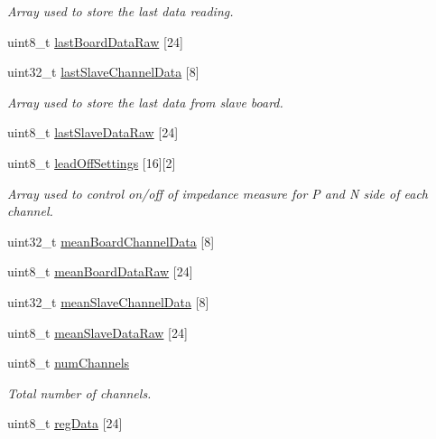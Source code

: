\begin{DoxyCompactItemize}
\begin{DoxyCompactList}\small\item\em Array used to store the last data reading. \end{DoxyCompactList}\item 
uint8\+\_\+t \hyperlink{group__ADS1299__Library_ga7a5c129fa297decd31d1b5b2860b3b6f}{last\+Board\+Data\+Raw} \mbox{[}24\mbox{]}
\item 
uint32\+\_\+t \hyperlink{group__ADS1299__Library_gaf412b1daf072ddca4def438f97d2c65c}{last\+Slave\+Channel\+Data} \mbox{[}8\mbox{]}
\begin{DoxyCompactList}\small\item\em Array used to store the last data from slave board. \end{DoxyCompactList}\item 
uint8\+\_\+t \hyperlink{group__ADS1299__Library_ga72ed7b344555cffff8c860e89e44afd6}{last\+Slave\+Data\+Raw} \mbox{[}24\mbox{]}
\item 
uint8\+\_\+t \hyperlink{group__ADS1299__Library_ga51cd0f121d75eaf14e9e4847f125dd8a}{lead\+Off\+Settings} \mbox{[}16\mbox{]}\mbox{[}2\mbox{]}
\begin{DoxyCompactList}\small\item\em Array used to control on/off of impedance measure for P and N side of each channel. \end{DoxyCompactList}\item 
uint32\+\_\+t \hyperlink{group__ADS1299__Library_ga4b3ef40d05b115ef45424a733bcbe230}{mean\+Board\+Channel\+Data} \mbox{[}8\mbox{]}
\item 
uint8\+\_\+t \hyperlink{group__ADS1299__Library_ga22acd6ef87276d02b78757e4fdcb6d2d}{mean\+Board\+Data\+Raw} \mbox{[}24\mbox{]}
\item 
uint32\+\_\+t \hyperlink{group__ADS1299__Library_ga07120ea83782df5ae895c52616d4b26c}{mean\+Slave\+Channel\+Data} \mbox{[}8\mbox{]}
\item 
uint8\+\_\+t \hyperlink{group__ADS1299__Library_gafc7614ccf46f25b6620258370c5d1cf5}{mean\+Slave\+Data\+Raw} \mbox{[}24\mbox{]}
\item 
uint8\+\_\+t \hyperlink{group__ADS1299__Library_gaad6ecaf79af18485d9b015821afee295}{num\+Channels}
\begin{DoxyCompactList}\small\item\em Total number of channels. \end{DoxyCompactList}\item 
uint8\+\_\+t \hyperlink{group__ADS1299__Library_ga534b53fd562140cae3041013449d27a1}{reg\+Data} \mbox{[}24\mbox{]}

\end{DoxyCompactItemize}

